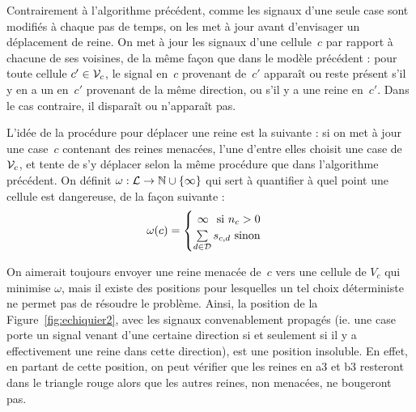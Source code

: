 
Contrairement à l'algorithme précédent, comme les signaux d'une seule case sont modifiés à chaque pas de temps, on les met à jour avant d'envisager un déplacement de reine. On met à jour les signaux d'une cellule~$c$ par rapport à chacune de ses voisines, de la même façon que dans le modèle précédent : pour toute cellule $c'\in\mathcal V_c$, le signal en~$c$ provenant de~$c'$ apparaît ou reste présent s'il y en a un en~$c'$ provenant de la même direction, ou s'il y a une reine en~$c'$. Dans le cas contraire, il disparaît ou n'apparaît pas.

L'idée de la procédure pour déplacer une reine est la suivante : si on met à jour une case~$c$ contenant des reines menacées, l'une d'entre elles choisit une case de $\mathcal V_c$, et tente de s'y déplacer selon la même procédure que dans l'algorithme précédent. 
On définit $\omega : \mathcal{L}\to\mathbb{N}\cup\{\infty\}$ qui sert à quantifier à quel point une cellule est dangereuse, de la façon suivante : \[
\omega(c) = 
\begin{cases}
  \hfill \infty \hfill \text{ si $n_c > 0$}\\
  \hfill \sum\limits_{d\in\D}s_{c,d} \hfill \text{ sinon}
\end{cases}
\]

On aimerait toujours envoyer une reine  menacée de~$c$ vers une cellule de $V_c$
qui minimise $\omega$, mais il existe des positions pour lesquelles un tel choix
déterministe ne  permet pas de résoudre  le problème.  Ainsi, la  position de la
Figure~\ref{fig:echiquier2}, avec  les signaux convenablement  propagés (ie. une
case porte un signal  venant d'une certaine direction si et seulement  si il y a
effectivement une reine  dans cette direction), est une  position insoluble.  En
effet, en partant de cette position, on peut vérifier que les reines en a3 et b3
resteront dans le  triangle rouge alors que les autres  reines, non menacées, ne
bougeront pas.




